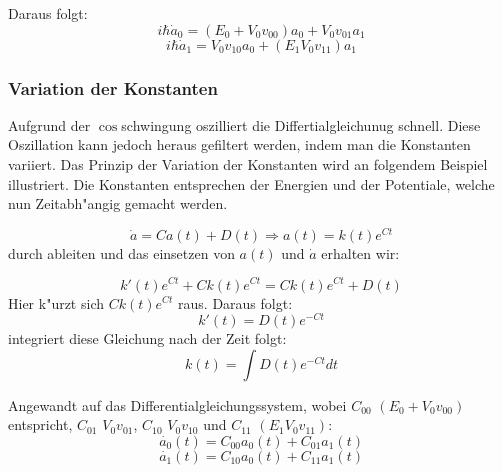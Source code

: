 \begin{refsection}
Daraus folgt:
\[
\ i\hbar\dot{a}_0 = (E_{0} + V_{0} v_{00}) a_{0} + V_{0} v_{01} a_{1}
\]
\[
\ i\hbar\dot{a}_1 = V_{0} v_{10} a_{0} + (E_{1} V_{0} v_{11}) a_{1}
\]

\subsubsection{Variation der Konstanten}
Aufgrund der $\cos$schwingung oszilliert die Differtialgleichunug
schnell.
Diese Oszillation kann jedoch heraus gefiltert werden, indem man die
Konstanten variiert.
Das Prinzip der Variation der Konstanten wird an folgendem Beispiel
illustriert.
Die Konstanten entsprechen der Energien und der Potentiale, welche nun
Zeitabh"angig gemacht werden.

\[
\ \dot{a} = C a(t) + D(t) \Rightarrow a(t) = k(t) e^{C t}
\] 
durch ableiten und das einsetzen von $ a(t)$ und  $ \dot{a} $ erhalten wir:

\[
\ k'(t) e^{C t} + C k(t) e^{C t} = C k(t) e^{C t} + D(t)
\] 
Hier k"urzt sich $ C k(t) e^{C t} $ raus.
Daraus folgt:
\[
\ k'(t) = D(t) e^{-C t}
\] 
integriert diese Gleichung nach der Zeit folgt:
\[
\ k(t) = \int D(t) e^{-C t} dt 
\]
 
Angewandt auf das Differentialgleichungssystem, wobei $C_{00}$ $(E_{0} + V_{0} v_{00})$
entspricht, $C_{01}$ $V_{0} v_{01}$, $C_{10}$ $V_{0} v_{10}$ und $C_{11}$ $(E_{1} V_{0} v_{11})$:
\[
\ \dot{a_{0}}(t) = C_{00}a_{0}(t) + C_{01}a_{1}(t)
\]
\[
\ \dot{a_{1}}(t) = C_{10}a_{0}(t) + C_{11}a_{1}(t)
\]


\end{refsection}
